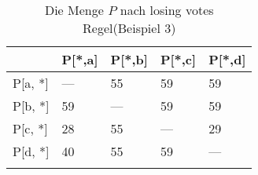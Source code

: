 \begin{longtable}[c]{|l|l|l|l|l|}
\hline
            & P{[}*,a{]} & P{[}*,b{]} & P{[}*,c{]} & P{[}*,d{]} \\ \hline
\endfirsthead
%
\endhead
%
P{[}a, *{]} & ---        & 55         & 59         & 59         \\ \hline
P{[}b, *{]} & 59         & ---        & 59         & 59         \\ \hline
P{[}c, *{]} & 28         & 55         & ---        & 29         \\ \hline
P{[}d, *{]} & 40         & 55         & 59         & ---        \\ \hline
\caption{Die Menge $P$ nach losing votes Regel(Beispiel 3)}
\label{beispiel3losing_p}\\
\end{longtable}